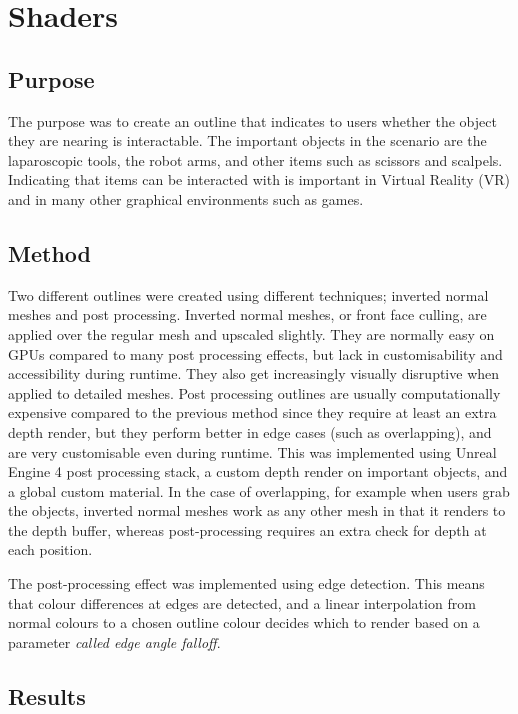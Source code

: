 \chapter{Shaders}

\section*{Purpose}
The purpose was to create an outline that indicates to users whether the object they are nearing is interactable. The important objects in the scenario are the laparoscopic tools, the robot arms, and other items such as scissors and scalpels. Indicating that items can be interacted with is important in Virtual Reality (VR) and in many other graphical environments such as games.

\section*{Method}
Two different outlines were created using different techniques; inverted normal meshes and post processing. Inverted normal meshes, or front face culling, are applied over the regular mesh and upscaled slightly. They are normally easy on GPUs compared to many post processing effects, but lack in customisability and accessibility during runtime. They also get increasingly visually disruptive when applied to detailed meshes. Post processing outlines are usually computationally expensive compared to the previous method since they require at least an extra depth render, but they perform better in edge cases (such as overlapping), and are very customisable even during runtime. This was implemented using Unreal Engine 4 post processing stack, a custom depth render on important objects, and a global custom material. In the case of overlapping, for example when users grab the objects, inverted normal meshes work as any other mesh in that it renders to the depth buffer, whereas post-processing requires an extra check for depth at each position.

The post-processing effect was implemented using edge detection. This means that colour differences at edges are detected, and a linear interpolation from normal colours to a chosen outline colour decides which to render based on a parameter \textit{called edge angle falloff}.

\section*{Results}


